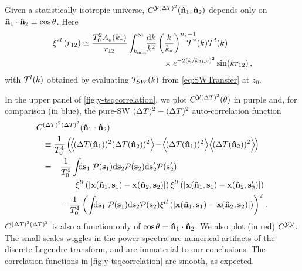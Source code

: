 \documentclass[fleqn,usenatbib]{mnras}
\begin{document}
    Given a statistically isotropic universe, $C^{\mathcal{Y}(\Delta
    T)^2}(\mathbf{{\bf\hat{n}}}_1,\mathbf{{\bf\hat{n}}}_2)$ depends only on
    ${\bf\hat{n}}_1\cdot{\bf\hat{n}}_2\equiv\cos\theta$.  Here
    \begin{align}\label{eqn:xiearlylateofdeltar}
        \xi^{el}\left(r_{12} \right) 
        &\simeq
            \frac{T_0^2 A_s(k_*)}{r_{12}}
               \int_{k_{\rm min}}^{\infty} \!\! \frac{\dif{k}}{k^2} 
                    \left(\frac{k}{k_*}\right)^{n_s-1}
                    \!\!\!\!\!\!\!\! \mcal{T}^{e}(k)
                    \mcal{T}^{l}(k) \\
            &\qquad \qquad \qquad \qquad \qquad \times 
                \Exp{-2 (k/k_{2LS})^2} \sin(k r_{12})   \,,\nonumber
    \end{align}
    with ${\cal{T}}^l(k) $ obtained by evaluating ${\cal{T}}_{SW}(k)$ from
    \eqref{eq:SWTransfer} at $z_0$.

    In the upper panel of \autoref{fig:y-tsqcorrelation}, we plot
    $C^{\mathcal{Y}({\Delta T})^2}(\theta)$ in purple and, for comparison (in blue), the
    pure-SW $({\Delta T})^2-({\Delta T})^2$ auto-correlation function
    \begin{align}
        C&^{(\DeltaT)^2 (\DeltaT)^2}(\mbf{\nhat}_1\cdot\mbf{\nhat}_2) \nonumber
        \\
        &\equiv
            \frac{1}{T_0^4}
            \left(\!
                \Big\langle \!(\DeltaT(\nhat_1))^2(\DeltaT(\nhat_2))^2 \Big\rangle
                \!-\! \Big\langle\!(\DeltaT(\nhat_1))^2\Big\rangle \Big\langle\!(\DeltaT(\nhat_2))^2 \Big\rangle
            \!\right)
        \\
        &=
            \phantom{+}\frac{1}{T_0^4}
            \int\!\!\! \dif{\mbf{s}_1} \; \mcal{P}(\mbf{s}_1) \dif{\mbf{s}_2} \mcal{P}(\mbf{s}_2) \dif{\mbf{s}'_2} \mcal{P}(\mbf{s}'_2)
            \\
            &\qquad\qquad
                \xi^{ll}\left(\norm{ \mbf{x}(\nhat_1,\mbf{s}_1) - \mbf{x}(\nhat_2,\mbf{s}_2) }\right)
                \xi^{ll}\left(\norm{ \mbf{x}(\nhat_1,\mbf{s}_1) - \mbf{x}(\nhat_2,\mbf{s}'_2) }\right) \nonumber 
            \\ &\qquad
                    - \frac{1}{T_0^4} \left( \int\!\!\! \dif{\mbf{s}_1} \; \mcal{P}(\mbf{s}_1) \dif{\mbf{s}_2} \mcal{P}(\mbf{s}_2)
                        \xi^{ll}\left(\norm{\mbf{x}(\nhat_1,\mbf{s}_1) - \mbf{x}(\nhat_2,\mbf{s}_2) }\right)
                        \right)^2
                    \nonumber\,.
    \end{align}
    $C^{({\Delta T})^2({\Delta T})^2}$ is also a function only of
    $\cos\theta={\bf\hat{n}}_1\cdot{\bf\hat{n}}_2$.  
    We also plot (in red) $C^{\mathcal{Y}\mathcal{Y}}$.  The small-scales wiggles in the power
    spectra are numerical artifacts of the discrete Legendre transform, and are
    immaterial to our conclusions.  The correlation functions in
    \autoref{fig:y-tsqcorrelation} are smooth, as expected. 
\end{document}
